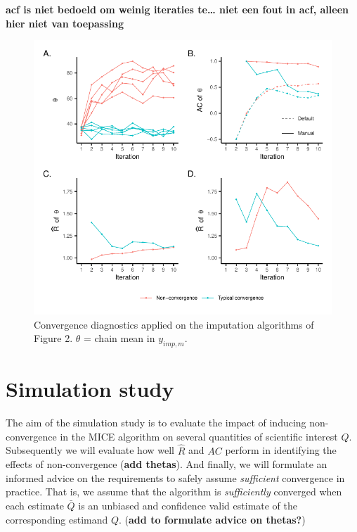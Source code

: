 \documentclass[Royal,times,sageh]{sagej}
\begin{document}
\textbf{acf is niet bedoeld om weinig iteraties te\ldots{} niet een fout
in acf, alleen hier niet van toepassing}

\begin{figure}

{\centering \includegraphics{manuscript_files/figure-latex/diagnostics-1} 

}

\caption{Convergence diagnostics applied on the imputation algorithms of Figure 2. $\theta$ = chain mean in $y_{imp, m}$.}\label{fig:diagnostics}
\end{figure}

\hypertarget{simulation-study}{%
\section{Simulation study}\label{simulation-study}}

The aim of the simulation study is to evaluate the impact of inducing
non-convergence in the MICE algorithm on several quantities of
scientific interest \(Q\). Subsequently we will evaluate how well
\(\widehat{R}\) and \(AC\) perform in identifying the effects of
non-convergence (\textbf{add thetas}). And finally, we will formulate an
informed advice on the requirements to safely assume \emph{sufficient}
convergence in practice. That is, we assume that the algorithm is
\emph{sufficiently} converged when each estimate \(\bar{Q}\) is an
unbiased and confidence valid estimate of the corresponding estimand
\(Q\). (\textbf{add to formulate advice on thetas?})
\end{document}
